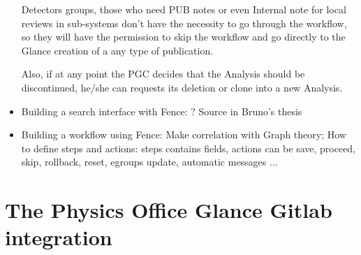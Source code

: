 \documentclass[NOTE, atlasdraft=true, texlive=2016, UKenglish]{\ATLASLATEXPATH atlasdoc}
\begin{document}
\begin{itemize}
Detectors groups, those who need PUB notes or even Internal note for local reviews in sub-systems don’t have the necessity to go through the workflow, so they will have the permission to skip the workflow and go directly to the Glance creation of a any type of publication.

Also, if at any point the PGC decides that the Analysis should be discontinued, he/she can requests its deletion or clone into a new Analysis.

\item Building a search interface with Fence: ?
Source in Bruno's thesis

\item Building a workflow using Fence:
Make correlation with Graph theory;
How to define steps and actions: steps contains fields, actions can be save, proceed, skip, rollback, reset, egroups update, automatic messages ...

\end{itemize}
\section{The Physics Office Glance Gitlab integration}%
\label{sec:poggintg}

\end{document}
